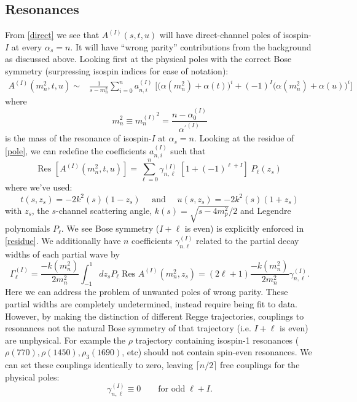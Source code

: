 \documentclass[aps,prd,amsmath,amssymb,superscriptaddress,onecolumn,
nofootinbib,showpacs,preprintnumbers]{revtex4-1}
\newcommand{\az}{\alpha_0}
\newcommand{\apr}{\alpha^\prime}
\newcommand{\as}{\alpha_s}
\begin{document}
\subsection{Resonances}
From \cref{direct} we see that $A^{(I)}(s,t,u)$ will have direct-channel poles of isospin-$I$ at every $\as = n$. It will have ``wrong parity'' contributions from the background as discussed above.
Looking first at the physical poles with the correct Bose symmetry (surpressing isospin indices for ease of notation):
	\begin{align} \label{pole}
	A^{(I)}(m_n^2,t,u) \sim& \frac{1}{s -  m_n^2} \sum_{i=0}^n a^{(I)}_{n,i} \; \bigg [ \big(\alpha(m_n^2) + \alpha(t) \big)^i + (-1)^{I} \big(\alpha(m_n^2) + \alpha(u) \big)^i \bigg]
	\end{align}
where 
	\begin{equation}
	m_n^2 \equiv {m_n^{(I)}}^2 = \frac{n - \az^{(I)}}{{\apr}^{(I)}}
	\end{equation}	
is the mass of the resonance of isospin-$I$ at $\as = n$.
Looking at the residue of \cref{pole}, we can redefine the coefficients $a_{n,i}^{(I)}$ such that
	\begin{equation} \label{residue}
	\text{Res }[ A^{(I)}(m_n^2,t,u)] = \sum_{\ell=0}^n \gamma_{n,\ell}^{(I)} \; [1 + (-1)^{\ell+I}] \; P_\ell(z_s)
	\end{equation}
where we've used:
	\begin{equation}
	t(s,z_s) = -2k^2(s)(1-z_s) \quad \text{ and } \quad u(s, z_s) = -2k^2(s)(1+z_s)
	\end{equation}
	with $z_s$, the $s$-channel scattering angle, $k(s) = \sqrt{s - 4m^2_p}/2$ and Legendre polynomials $P_\ell$. We see Bose symmetry ($I+\ell$ is even) is explicitly enforced in \cref{residue}. We additionally have $n$ coefficients $\gamma_{n.\ell}^{(I)}$ related to the partial decay widths of each partial wave by
	\begin{equation}
	\Gamma^{(I)}_\ell = \frac{ - k(m^2_n)}{2m^2_n} \int^1_{-1} dz_s P_\ell \; \text{Res }A^{(I)}(m^2_n, z_s) = (2\ell +1) \frac{ - k(m^2_n)}{2m^2_n} \gamma^{(I)}_{n,\ell}.
	\end{equation}
Here we can address the problem of unwanted poles of wrong parity. These partial widths are completely undetermined, instead require being fit to data. However, by making the distinction of different Regge trajectories, couplings to resonances not the natural Bose symmetry of that trajectory (i.e. $I+\ell$ is even) are unphysical. For example the $\rho$ trajectory containing isospin-1 resonances ($\rho(770), \rho(1450), \rho_3(1690)$, etc) should not contain spin-even resonances.  We can set these couplings identically to zero, leaving $\lceil n/2 \rceil$ free couplings for the physical poles: 	
		\begin{equation}
		\gamma_{n,\ell}^{(I)} \equiv 0 \qquad \text{for odd} \; \ell+I.
		\end{equation}
\end{document}

